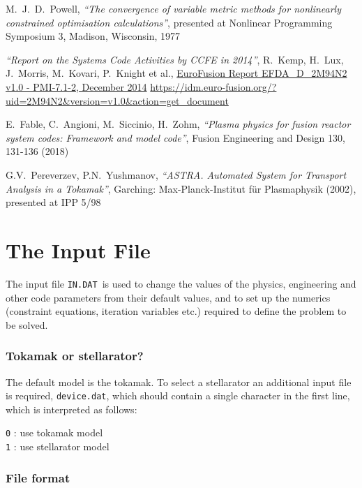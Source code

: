 \documentclass[11pt,a4paper]{report}
\newcommand{\indat}{\mbox{\texttt{IN.DAT}}}
\newcommand{\setheader}[1]
 {\markright{\rlap{\lower0.8ex\hbox to\textwidth{\hrulefill}}{\bf#1}}}
\newcommand{\myappendix}[1]{\small\normalsize
 \setcounter{footnote}{0}
 \chapter{#1}
 \pagestyle{myheadings}
 \setheader{Appendix \thechapter\hspace{0.8em}#1}}
\begin{document}
\begin{thebibliography}{99}
M.\ J.\ D.\ Powell,
\textit{``The convergence of variable metric methods for nonlinearly
  constrained optimisation calculations''},
presented at Nonlinear Programming Symposium 3, Madison, Wisconsin, 1977

\textit{``Report on the Systems Code Activities by CCFE in 2014''},
R.\ Kemp, H.\ Lux, J.\ Morris, M.\ Kovari, P.\ Knight et al.,
\href{https://idm.euro-fusion.org/?uid=2M94N2\&version=v1.0\&action=get\_document}
{EuroFusion Report EFDA\_D\_2M94N2 v1.0 - PMI-7.1-2, December 2014}
\url{https://idm.euro-fusion.org/?uid=2M94N2\&version=v1.0\&action=get\_document}

E.\ Fable, C.\ Angioni, M.\ Siccinio, H.\ Zohm,
\textit{``Plasma physics for fusion reactor system codes: Framework and model code''},
Fusion Engineering and Design 130, 131-136 (2018)

G.V.\ Pereverzev, P.N.\ Yushmanov,
\textit{``ASTRA. Automated System for Transport Analysis in a Tokamak''},
Garching: Max-Planck-Institut für Plasmaphysik (2002), presented at IPP 5/98 


\end{thebibliography}

\myappendix{The Input File}
\label{app:infile}

The input file \indat\ is used to change the values of the physics,
engineering and other code parameters from their default values, and to set up
the numerics (constraint equations, iteration variables etc.) required to
define the problem to be solved.

\subsection{Tokamak or stellarator?}
\label{sec:device}

The default model is the tokamak.  To select a stellarator an additional input file is required, \texttt{device.dat}, which should contain a single character in the first
line, which is interpreted as follows:
\begin{tabbing}
\hspace{15mm}\= \texttt{0} : use tokamak model \\
\> \texttt{1} : use stellarator model \\
\end{tabbing}

\subsection{File format}
\end{document}
